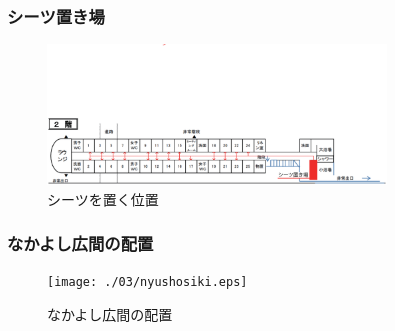 \newpage

\subsubsection{シーツ置き場}
\begin{figure}[htbp]
 \begin{center}
  \includegraphics[width=90mm]{./03/situ.eps}
\end{center}
 \caption{シーツを置く位置}
 \label{fig:seatshaichi}
\end{figure}

\subsubsection{なかよし広間の配置}
\begin{figure}[htbp]
 \begin{center}
  \texttt{[image: ./03/nyushosiki.eps]}
  \end{center}
 \caption{なかよし広間の配置}
 \label{fig:nakayoshihaichi}
\end{figure}

\newpage
\newpage

